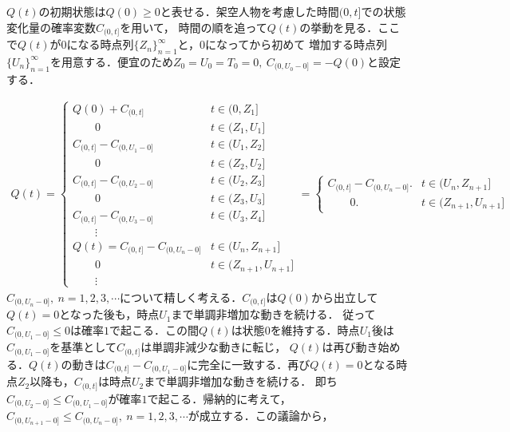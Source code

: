 \documentclass[a4j,papersize,disablejfam,slide,14pt]{jsarticle}
\begin{document}
    $Q(t)$の初期状態は$Q(0) \geq 0$と表せる．架空人物を考慮した時間$(0, t]$での状態変化量の確率変数$C_{(0, t]}$を用いて，
    時間の順を追って$Q(t)$の挙動を見る．ここで$Q(t)$が$0$になる時点列$\{Z_n\}_{n=1}^{\infty}$と，$0$になってから初めて
    増加する時点列$\{U_n\}_{n=1}^{\infty}$を用意する．便宜のため$Z_0 = U_0 = T_0 = 0,\ C_{(0, U_0-0]} = -Q(0)$と設定する．
    
    \begin{align}
    	Q(t) =
        \begin{cases}
        	 Q(0) + C_{(0, t]} & \text{$t \in (0, Z_1]$} \\
             \qquad 0 & \text{$t \in (Z_1, U_1]$} \\
             C_{(0, t]} - C_{(0, U_1-0]} & \text{$t \in (U_1, Z_2]$} \\
             \qquad 0 & \text{$t \in (Z_2, U_2]$} \\
             C_{(0, t]} - C_{(0, U_2-0]} & \text{$t \in (U_2, Z_3]$} \\
             \qquad 0 & \text{$t \in (Z_3, U_3]$} \\
             C_{(0, t]} - C_{(0, U_3-0]} & \text{$t \in (U_3, Z_4]$} \\
        	\qquad \vdots \\
            Q(t) = C_{(0, t]} - C_{(0, U_n-0]} & \text{$t \in (U_n, Z_{n+1}]$} \\
            \qquad 0 & \text{$t \in (Z_{n+1}, U_{n+1}]$} \\
       		\qquad \vdots
        \end{cases}
        =
        \begin{cases}
        	C_{(0, t]} - C_{(0, U_n-0]}. & \text{$t \in (U_n, Z_{n+1}]$} \\
            \qquad 0. & \text{$t \in (Z_{n+1}, U_{n+1}]$}
        \end{cases}
    \end{align}
    $C_{(0, U_n-0]},\ n=1,2,3,\cdots$について精しく考える．$C_{(0, t]}$は$Q(0)$から出立して$Q(t)=0$となった後も，時点$U_1$まで単調非増加な動きを続ける．
    従って$C_{(0, U_1-0]} \leq 0$は確率$1$で起こる．この間$Q(t)$は状態$0$を維持する．時点$U_1$後は$C_{(0, U_1-0]}$を基準として$C_{(0, t]}$は単調非減少な動きに転じ，
    $Q(t)$は再び動き始める．$Q(t)$の動きは$C_{(0, t]} - C_{(0, U_1-0]}$に完全に一致する．再び$Q(t)=0$となる時点$Z_2$以降も，$C_{(0, t]}$は時点$U_2$まで単調非増加な動きを続ける．
    即ち$C_{(0, U_2-0]} \leq C_{(0, U_1-0]}$が確率$1$で起こる．帰納的に考えて，$C_{(0, U_{n+1}-0]} \leq C_{(0, U_n-0]},\ n=1,2,3,\cdots$が成立する．この議論から，
\end{document}
